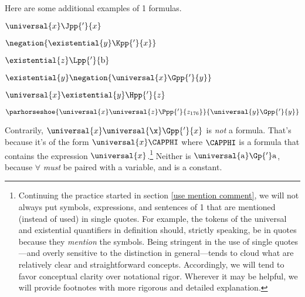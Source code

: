 Here are some additional examples of \GQL{}1 formulas. 
\begin{multicols}{2}
\begin{menumerate}
\item $\universal{\variable{x}}\Jpp{'}{\variable{x}}$ 
\item $\negation{\existential{\variable{y}}\Kpp{'}{\variable{x}}}$ 
\item $\existential{\variable{z}}\Lpp{'}{\constant{b}}$
\item $\existential{\variable{y}}\negation{\universal{\variable{x}}\Gpp{'}{\variable{y}}}$ 
\item $\universal{\variable{x}}\existential{\variable{y}}\Hpp{'}{\variable{z}}$ 
\item $\parhorseshoe{\universal{\variable{x}}\universal{\variable{z}}\Ppp{'}{\variable{z}_{176}}}{\universal{\variable{y}}\Gpp{'}{\variable{y}}}$ 
\end{menumerate}
\end{multicols}
\noindent{}Contrarily, $\universal{\variable{x}}\universal{\x}\Gpp{'}{\variable{x}}$ is \emph{not} a formula.  That's because it's of the form $\universal{\variable{x}}\CAPPHI$ where $\CAPPHI$ is a formula that contains the expression $\universal{\variable{x}}$.\footnote{Continuing the practice started in section \ref{use mention comment}, we will not always put symbols, expressions, and sentences of \GQL{}1 that are mentioned (instead of used) in single quotes. 
For example, the tokens of the universal and existential quantifiers in definition  should, strictly speaking, be in quotes because they \emph{mention} the symbols. 
Being stringent in the use of single quotes---and overly sensitive to the  distinction in general---tends to cloud what are relatively clear and straightforward concepts.  Accordingly, we will tend to favor conceptual clarity over notational rigor. 
Wherever it may be helpful, we will provide footnotes with more rigorous and detailed explanation.} Neither is $\universal{\constant{a}}\Gp{'}\constant{a}$, because $\forall$ \emph{must} be paired with a variable, and  is a constant.

